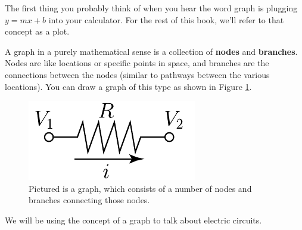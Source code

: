 The first thing you probably think of when you hear the word graph is plugging $y=mx+b$ into your calculator.  For the rest of this book, we'll refer to that concept as a plot.

A graph in a purely mathematical sense is a collection of {\bf nodes} and
{\bf branches}. Nodes are like locations or specific points in space, and
branches are the connections between the nodes (similar to pathways between the various locations).  You can draw a graph of this type as shown in Figure \ref{fig:graphTheory}.

\begin{figure}
  \includegraphics{figures/ohmsLaw}
  \caption{Pictured is a graph, which consists of a number of nodes and branches connecting those nodes.}
  \label{fig:graphTheory}
\end{figure}

We will be using the concept of a graph to talk about electric circuits.
